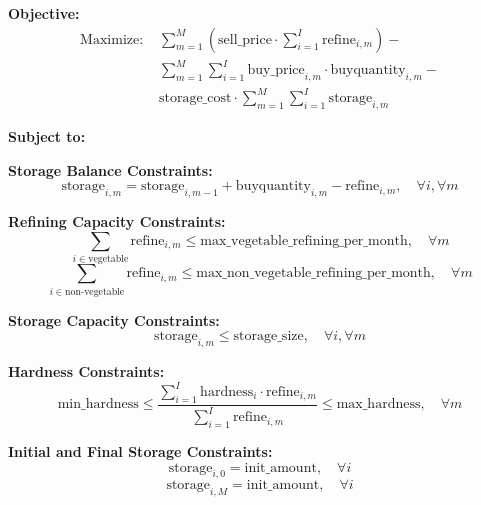 \documentclass{article}
\begin{document}
\textbf{Objective:}
\[
\begin{align*}
    \text{Maximize: } & \sum_{m=1}^{M} \left( \text{sell\_price} \cdot \sum_{i=1}^{I} \text{refine}_{i,m} \right) - \\
                      & \sum_{m=1}^{M} \sum_{i=1}^{I} \text{buy\_price}_{i,m} \cdot \text{buyquantity}_{i,m} - \\
                      & \text{storage\_cost} \cdot \sum_{m=1}^{M} \sum_{i=1}^{I} \text{storage}_{i,m}
\end{align*}
\]

\textbf{Subject to:}

\textbf{Storage Balance Constraints:}
\[
\text{storage}_{i,m} = \text{storage}_{i,m-1} + \text{buyquantity}_{i,m} - \text{refine}_{i,m}, \quad \forall i, \forall m
\]

\textbf{Refining Capacity Constraints:}
\[
\sum_{i \in \text{vegetable}} \text{refine}_{i,m} \leq \text{max\_vegetable\_refining\_per\_month}, \quad \forall m
\]
\[
\sum_{i \in \text{non-vegetable}} \text{refine}_{i,m} \leq \text{max\_non\_vegetable\_refining\_per\_month}, \quad \forall m
\]

\textbf{Storage Capacity Constraints:}
\[
\text{storage}_{i,m} \leq \text{storage\_size}, \quad \forall i, \forall m
\]

\textbf{Hardness Constraints:}
\[
\text{min\_hardness} \leq \frac{\sum_{i=1}^{I} \text{hardness}_{i} \cdot \text{refine}_{i,m}}{\sum_{i=1}^{I} \text{refine}_{i,m}} \leq \text{max\_hardness}, \quad \forall m
\]

\textbf{Initial and Final Storage Constraints:}
\[
\text{storage}_{i,0} = \text{init\_amount}, \quad \forall i
\]
\[
\text{storage}_{i,M} = \text{init\_amount}, \quad \forall i
\]
\end{document}
